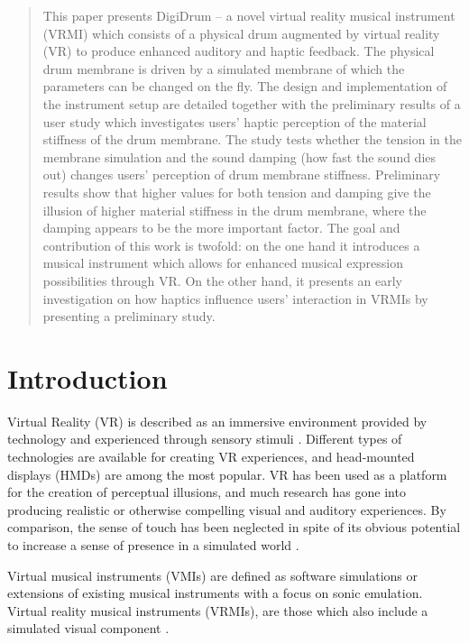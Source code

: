 \begin{abstract}
    This paper presents DigiDrum -- a novel virtual reality musical instrument (VRMI) which consists of a physical drum augmented by virtual reality (VR) to produce enhanced auditory and haptic feedback. The physical drum membrane is driven by a simulated membrane of which the parameters can be changed on the fly. The design and implementation of the instrument setup are detailed together with the preliminary results of a user study which investigates users' haptic perception of the material stiffness of the drum membrane. The study tests whether the tension in the membrane simulation and the sound damping (how fast the sound dies out) changes users' perception of drum membrane stiffness. Preliminary results show that higher values for both tension and damping give the illusion of higher material stiffness in the drum membrane, where the damping appears to be the more important factor. The goal and contribution of this work is twofold: on the one hand it introduces a musical instrument which allows for enhanced musical expression possibilities through VR. On the other hand, it presents an early investigation on how haptics influence users' interaction in VRMIs by presenting a preliminary study.
    \end{abstract}
    \section{Introduction}\label{sec:introduction}
    Virtual Reality (VR) is described as an immersive environment provided by technology and experienced through sensory stimuli \cite{Serafin:2017}. %
    Different types of technologies are available for creating VR experiences, and head-mounted displays (HMDs) are among the most popular. VR has been used as a platform for the creation of perceptual illusions, and much research has gone into producing realistic or otherwise compelling visual and auditory experiences. By comparison, the sense of touch has been neglected in spite of its obvious potential to increase a sense of presence in a simulated world \cite{Serafin:2017}.
    
    Virtual musical instruments (VMIs) are defined as software simulations or extensions of existing musical instruments with a focus on sonic emulation. Virtual reality musical instruments (VRMIs), are those which also include a simulated visual component \cite{Serafin:2016}. 
    

